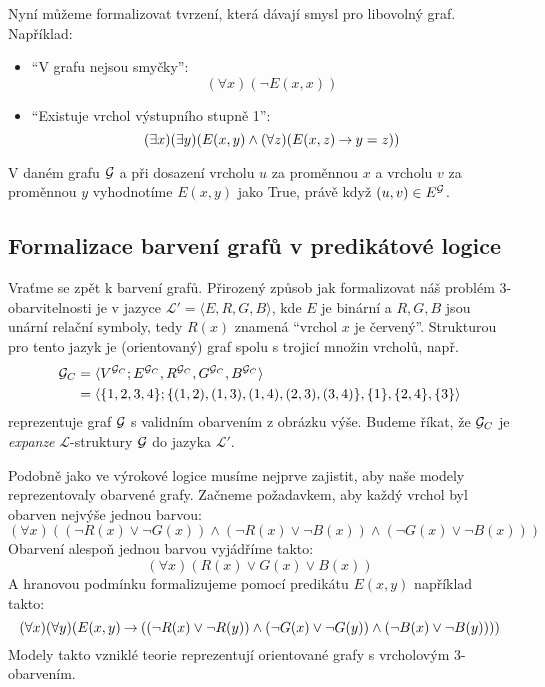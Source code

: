 Nyní můžeme formalizovat tvrzení, která dávají smysl pro libovolný graf. Například: 
\begin{itemize}
    \item ``V grafu nejsou smyčky'': \[ (\forall x)(\neg E(x,x)) \] 
    \item ``Existuje vrchol výstupního stupně 1'': \[ (\exists x)(\exists y)(E(x,y) \land (\forall z)(E(x,z) \mathbin{\rightarrow} y=z)) \] 
\end{itemize}
V daném grafu \(\mathcal{G}\) a při dosazení vrcholu \(u\) za proměnnou \(x\) a vrcholu \(v\) za proměnnou \(y\) vyhodnotíme \( E(x,y) \) jako True, právě když \( (u,v)\in E^{\mathcal{G}} \).


\subsection{Formalizace barvení grafů v predikátové logice}


Vraťme se zpět k barvení grafů. Přirozený způsob jak formalizovat náš problém 3-obarvitelnosti je v jazyce \( \mathcal L' =\langle E, R, G, B \rangle \), kde \(E\) je binární a \(R,G,B\) jsou unární relační symboly, tedy \(R(x)\) znamená ``vrchol \(x\) je červený''. Strukturou pro tento jazyk je (orientovaný) graf spolu s trojicí množin vrcholů, např.
\begin{align*}
\mathcal{G}_C &= \langle V^{\mathcal{G}_C}; E^{\mathcal{G}_C}, R^{\mathcal{G}_C}, G^{\mathcal{G}_C}, B^{\mathcal{G}_C} \rangle \\
&= \langle \{1,2,3,4\}; \{(1,2),(1,3),(1,4),(2,3),(3,4)\}, \{1\}, \{2,4\}, \{3\} \rangle    
\end{align*}
reprezentuje graf \( \mathcal{G} \) s validním obarvením z obrázku výše. Budeme říkat, že \( \mathcal{G}_C \) je \emph{expanze} \(\mathcal L\)-struktury \( \mathcal{G} \) do jazyka \( \mathcal L' \).

Podobně jako ve výrokové logice musíme nejprve zajistit, aby naše modely reprezentovaly obarvené grafy. Začneme požadavkem, aby každý vrchol byl obarven nejvýše jednou barvou:
\[
(\forall x)((\neg R(x) \lor \neg G(x)) \land (\neg R(x) \lor \neg B(x)) \land (\neg G(x) \lor \neg B(x)))
\]
Obarvení alespoň jednou barvou vyjádříme takto:
\[
(\forall x)(R(x) \lor G(x) \lor B(x))
\]
A hranovou podmínku formalizujeme pomocí predikátu \( E(x,y) \) například takto:
\[	
(\forall x)(\forall y)(E(x,y) \mathbin{\rightarrow} ((\neg R(x) \lor \neg R(y)) \land (\neg G(x) \lor \neg G(y)) \land (\neg B(x) \lor \neg B(y))))
\]
Modely takto vzniklé teorie reprezentují orientované grafy s vrcholovým 3-obarvením. 


